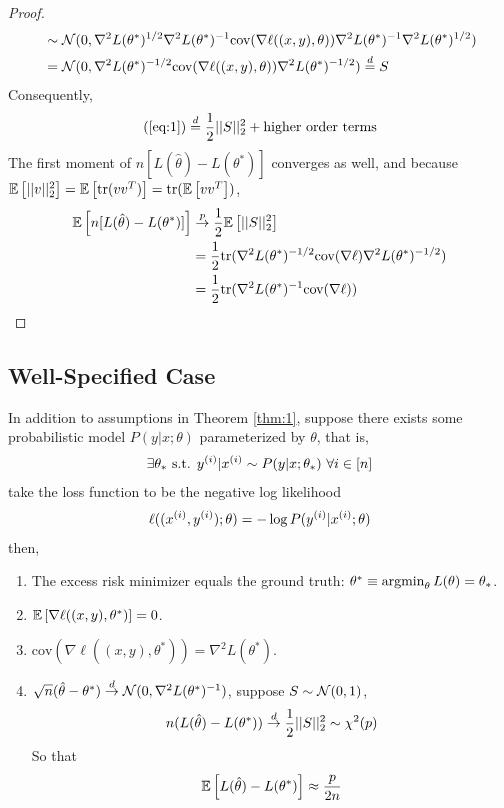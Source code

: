 \documentclass[11pt]{article}
\newcommand{\thetahat}[0]{\hat{\theta}}
\newcommand{\convp}[0]{\overset{p}{\rightarrow}}
\newcommand{\convd}[0]{\overset{d}{\rightarrow}}
\newcommand{\inv}[0]{^{-1}}
\newcommand{\cov}[0]{\text{cov}}
\newcommand{\tr}[0]{\text{tr}}
\newcommand{\suchthat}[0]{\text{ s.t. }}
\begin{document}
\begin{proof}
\begin{align}
			&\sim \mc{N}(0, \nabla^2 L(\theta^*)^{1/2} \nabla^2L(\theta^*)\inv \cov(\nabla \ell((x,y),\theta)) \nabla^2L(\theta^*)\inv \nabla^2 L(\theta^*)^{1/2})  \\
			&=\mc{N}(0, \nabla^2 L(\theta^*)^{-1/2} \cov(\nabla \ell((x,y),\theta)) \nabla^2 L(\theta^*)^{-1/2})
			\overset{d}{=} S
		\end{align}
		Consequently, 
		\begin{align}
			(\ref{eq:1}) \overset{d}{=} \frac{1}{2}\vert \vert {S} \vert \vert_2^2 + \text{{higher order terms}}
		\end{align}
		The first moment of $n[L(\thetahat) - L(\theta^*)]$ converges as well, and because $\expect{\norm{v}_2^2} = \expect{\tr(v v^T)} = \tr(\expect{v v^T})$,
		\begin{align}
			\expect{n[L(\thetahat) - L(\theta^*)]} &\convp \frac{1}{2} \expect{\norm{S}_2^2} \\
			&= \frac{1}{2} \tr(\nabla^2 L(\theta^*)^{-1/2} \cov(\nabla \ell) \nabla^2 L(\theta^*)^{-1/2}) \\
			&= \frac{1}{2} \tr(\nabla^2L(\theta^*)\inv \cov(\nabla \ell))
		\end{align}
	\end{proof}

	\subsection{Well-Specified Case}
	\begin{theorem}
		In addition to assumptions in Theorem \ref{thm:1}, suppose there exists some probabilistic model $P(y|x; \theta)$ parameterized by $\theta$, that is,
		\begin{align}
			\exists \theta_* \suchthat y\upi |x\upi \sim P(y|x;\theta_*)\ \forall i \in [n] 
		\end{align}
		take the loss function to be the negative log likelihood
		\begin{align}
			\ell((x^{(i)}, y^{(i)}); \theta) = - \log P(y^{(i)} | x^{(i)}; \theta)
		\end{align}
		then,
		\begin{enumerate}
			\item The excess risk minimizer equals the ground truth: $\theta^* \equiv \operatorname*{argmin}_{\theta} L(\theta) = \theta_*$.
			\item $\mathbb{E}\left[{\nabla \ell((x, y), \theta^*)}\right] = 0$.
			\item $\cov(\nabla \ell((x, y), \theta^*)) = \nabla^2 L(\theta^*)$.
			\item $\sqrt{n}(\thetahat - \theta^*) \convd \mc{N}(0, \nabla^2 L(\theta^*)\inv)$, suppose $S \sim \mathcal{{N}}(0, 1)$,
			\begin{align}
				n (L(\thetahat) - L(\theta^*)) \convd \frac{1}{2} \norm{S}_2^2 \sim \chi^2(p)
			\end{align}
			So that
			\begin{align}
				\expect{L(\thetahat) - L(\theta^*)} \approx \frac{p}{2n}
			\end{align}
		\end{enumerate}
	\end{theorem}
	
\end{document}
